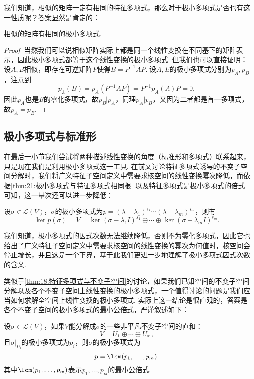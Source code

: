 我们知道，相似的矩阵一定有相同的特征多项式，那么对于极小多项式是否也有这一性质呢？答案显然是肯定的：
\begin{theorem}
    相似的矩阵有相同的极小多项式.
\end{theorem}
\begin{proof}
    当然我们可以说相似矩阵实际上都是同一个线性变换在不同基下的矩阵表示，因此极小多项式都等于这个线性变换的极小多项式. 但我们也可以直接证明：设$A,B$相似，即存在可逆矩阵$P$使得$B=P^{-1}AP$. 设$A,B$的极小多项式分别为$p_A,p_B$，注意到
    \[p_A(B)=p_A(P^{-1}AP)=P^{-1}p_A(A)P=0,\]
    因此$p_A$也是$B$的零化多项式，故$p_B\vert p_A$，同理$p_A\vert p_B$，又因为二者都是首一多项式，故$p_A=p_B$.
\end{proof}

\subsection{极小多项式与标准形}

在最后一小节我们尝试将两种描述线性变换的角度（标准形和多项式）联系起来，只是现在我们是利用极小多项式这一工具. 在前文讨论特征多项式诱导的不变子空间分解时，我们将广义特征子空间定义中需要求核空间的线性变换幂次降低，而依据\autoref{thm:21:极小多项式与特征多项式相同根} 以及特征多项式是极小多项式的倍式可知，这一幂次还可以进一步降低：
\begin{theorem} \label{thm:21:极小多项式与分解}
    设$\sigma\in \mathcal{L}(V)$，$\sigma$的极小多项式为$p=(\lambda-\lambda_1)^{s_1}\cdots(\lambda-\lambda_m)^{s_m}$，则有
    \[\ker p(\sigma)=V=\ker (\sigma-\lambda_1I)^{s_1}\oplus\cdots\oplus\ker (\sigma-\lambda_mI)^{s_m}.\]
\end{theorem}

我们知道，极小多项式的因式次数无法继续降低，否则不为零化多项式，因此它也给出了广义特征子空间定义中需要求核空间的线性变换的幂次为何值时，核空间会停止增长，并且这是一个下界，基于此我们更进一步地理解了极小多项式因式次数的含义.

类似于\autoref{thm:18:特征多项式与不变子空间}的讨论，如果我们已知空间的不变子空间分解以及各个不变子空间上线性变换的极小多项式，一个值得讨论的问题是我们应当如何求解全空间上线性变换的极小多项式. 实际上这一结论是很直观的，答案是各个不变子空间的极小多项式的最小公倍式，严谨叙述如下：
\begin{theorem} \label{thm:21:极小多项式与不变子空间}
    设$\sigma\in\mathcal{L}(V)$，如果$V$能分解成$\sigma$的一些非平凡不变子空间的直和：
    \[V=U_1\oplus\cdots\oplus U_m,\]
    且$\sigma\vert_{U_i}$的极小多项式为$p_i$，则$\sigma$的极小多项式为
    \[p=\lcm(p_1,\ldots,p_m).\]
    其中$\lcm(p_1,\ldots,p_m)$表示$p_1,\ldots,p_m$的最小公倍式.
\end{theorem}

